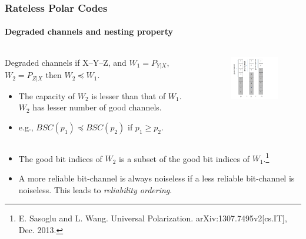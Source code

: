 \documentclass[xcolor=dvipsnames]{beamer}
\begin{document}
\begin{frame}[label = dgnest]
\frametitle{Rateless Polar Codes}
\framesubtitle{Degraded channels and nesting property}
\begin{columns}
\begin{column}{0.6\textwidth}
\begin{block}{Degraded channels} 
if X\---Y\---Z, and $W_1=P_{Y|X}$, $W_2=P_{Z|X}$ then $W_2 \preceq W_1$.
\end{block}
\begin{itemize}
\item The capacity of $W_2$ is lesser than that of $W_1$. $W_2$ has lesser number of good channels.
\item e.g., $BSC(p_1) \preceq BSC(p_2)$ if $p_1 \geq p_2$.
\end{itemize}
\end{column}
\begin{column}{0.3\textwidth}
\begin{figure}
\centering
\includegraphics[width=5cm]{./relorder.png}
\end{figure}
\end{column}
\end{columns}
\begin{itemize}
\item The good bit indices of $W_2$ is a subset of the good bit indices of $W_1$.\footnote{\tiny E. Sasoglu and L. Wang. Universal Polarization. arXiv:1307.7495v2[cs.IT], Dec.
2013.}
\item  A more reliable bit-channel is always noiseless if a less reliable bit-channel is noiseless. This leads to \emph{reliability ordering}.
\end{itemize}
\end{frame}
\end{document}
